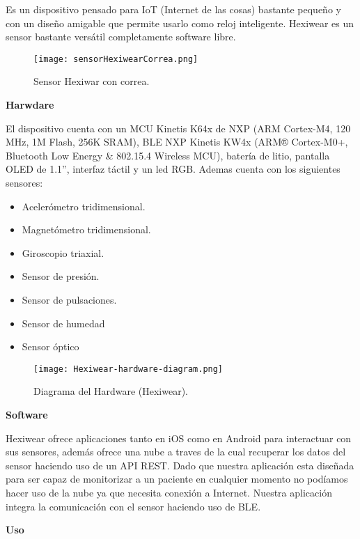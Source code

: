 \documentclass[11pt,spanish]{article}
\begin{document}
Es un dispositivo pensado para IoT (Internet de las cosas) bastante pequeño y con un diseño amigable que permite usarlo como reloj inteligente. Hexiwear es un sensor bastante versátil completamente software libre.
\newline

\begin{figure}
  \centering
  \texttt{[image: sensorHexiwearCorrea.png]}
  \caption{Sensor Hexiwar con correa.}
\end{figure}

{\bf Harwdare}
\newline

El dispositivo cuenta con un MCU Kinetis K64x de NXP (ARM Cortex-M4, 120 MHz, 1M Flash, 256K SRAM), BLE NXP Kinetis KW4x (ARM® Cortex-M0+, Bluetooth Low Energy \& 802.15.4 Wireless MCU), batería de litio, pantalla OLED
de 1.1'', interfaz táctil y un led RGB. Ademas cuenta con los siguientes sensores:

\begin{itemize}
  \item Acelerómetro tridimensional.
  \item Magnetómetro tridimensional.
  \item Giroscopio triaxial.
  \item Sensor de presión.
  \item Sensor de pulsaciones.
  \item Sensor de humedad
  \item Sensor óptico
\end{itemize}

\begin{figure}[H]
  \centering
  \texttt{[image: Hexiwear-hardware-diagram.png]}
  \caption{Diagrama del Hardware (Hexiwear).}
\end{figure}

{\bf Software}
\newline

Hexiwear ofrece aplicaciones tanto en iOS como en Android para interactuar con sus sensores, además ofrece una nube a traves de la cual recuperar los datos del sensor haciendo uso de un API REST. Dado que nuestra aplicación esta diseñada para ser capaz de monitorizar a un paciente en cualquier momento no podíamos hacer uso de la nube ya que necesita conexión a Internet. Nuestra aplicación integra la comunicación con el sensor haciendo uso de BLE.
\newline

{\bf Uso}
\newline
\end{document}
